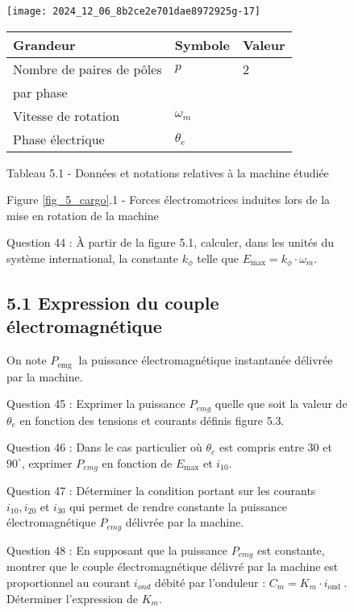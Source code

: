 \begin{figure}[!htb]
\begin{center}
\texttt{[image: 2024\_12\_06\_8b2ce2e701dae8972925g-17]}

\begin{center}
\begin{tabular}{lll}
Grandeur & Symbole & Valeur \\
\hline
Nombre de paires de pôles & \(p\) & 2 \\
par phase &  &  \\
Vitesse de rotation & \(\omega_{m}\) &  \\
Phase électrique & \(\theta_{e}\) &  \\
\hline
\end{tabular}
\end{center}

Tableau 5.1 - Données et notations relatives à la machine étudiée

Figure \ref{fig_5_cargo}.1 - Forces électromotrices induites lors de la mise en rotation de la machine

Question 44 : À partir de la figure 5.1, calculer, dans les unités du système international, la constante \(k_{\phi}\) telle que \(E_{\max }=k_{\phi} \cdot \omega_{m}\).

\subsection{5.1 Expression du couple électromagnétique}
On note \(P_{\text {emg }}\) la puissance électromagnétique instantanée délivrée par la machine.

Question 45 : Exprimer la puissance \(P_{e m g}\) quelle que soit la valeur de \(\theta_{e}\) en fonction des tensions et courants définis figure 5.3.

Question 46 : Dans le cas particulier où \(\theta_{e}\) est compris entre 30 et \(90^{\circ}\), exprimer \(P_{e m g}\) en fonction de \(E_{\max }\) et \(i_{10}\).

Question 47 : Déterminer la condition portant sur les courants \(i_{10}, i_{20}\) et \(i_{30}\) qui permet de rendre constante la puissance électromagnétique \(P_{e m g}\) délivrée par la machine.

Question 48 : En supposant que la puissance \(P_{e m g}\) est constante, montrer que le couple électromagnétique délivré par la machine est proportionnel au courant \(i_{o n d}\) débité par l'onduleur : \(C_{m}=K_{m} \cdot i_{\text {ond }}\). Déterminer l'expression de \(K_{m}\).


\end{center}
\end{figure}

